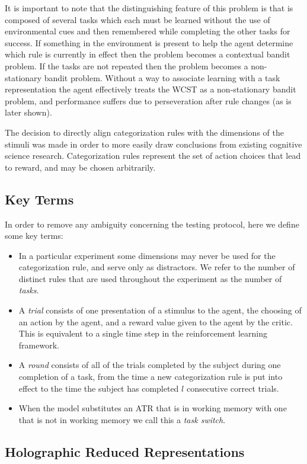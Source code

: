 \documentclass[10pt,letterpaper]{article}
\begin{document}
It is important to note that the distinguishing feature of this problem is that is composed of several tasks which each must be learned without the use of environmental cues and then remembered while completing the other tasks for success. If something in the environment is present to help the agent determine which rule is currently in effect then the problem becomes a contextual bandit problem. If the tasks are not repeated then the problem becomes a non-stationary bandit problem. Without a way to associate learning with a task representation the agent effectively treats the WCST as a non-stationary bandit problem, and performance suffers due to perseveration after rule changes (as is later shown). 

The decision to directly align categorization rules with the dimensions of the stimuli was made in order to more easily draw conclusions from existing cognitive science research. Categorization rules represent the set of action choices that lead to reward, and may be chosen arbitrarily.

\subsection{Key Terms}

In order to remove any ambiguity concerning the testing protocol, here we define some key terms:
\begin{itemize}
\item In a particular experiment some dimensions may never be used for the categorization rule, and serve only as distractors. We refer to the number of distinct rules that are used throughout the experiment as the number of \textit{tasks}. 
\item A \textit{trial} consists of one presentation of a stimulus to the agent, the choosing of an action by the agent, and a reward value given to the agent by the critic. This is equivalent to a single time step in the reinforcement learning framework. 
\item A \textit{round} consists of all of the trials completed by the subject during one completion of a task, from the time a new categorization rule is put into effect to the time the subject has completed $l$ consecutive correct trials. 
\item When the model substitutes an ATR that is in working memory with one that is not in working memory we call this a \textit{task switch}. 
\end{itemize}

\subsection{Holographic Reduced Representations}
\label{sec:hrr}
\end{document}
